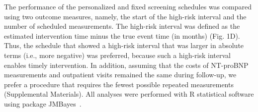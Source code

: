 The performance of the personalized and fixed screening schedules was compared using two outcome measures, namely, the start of the high-risk interval and the number of scheduled measurements. The high-risk interval was defined as the estimated intervention time minus the true event time (in months) (Fig. 1D). Thus, the schedule that showed a high-risk interval that was larger in absolute terms (i.e., more negative) was preferred, because such a high-risk interval enables timely intervention. In addition, assuming that the costs of NT-proBNP measurements and outpatient visits remained the same during follow-up, we prefer a procedure that requires the fewest possible repeated measurements (Supplemental Materials). All analyses were performed with R statistical software using package JMBayes~\citep{rizopoulosJMbayes}.